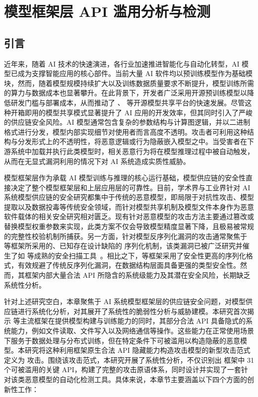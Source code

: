 \chapter{模型框架层 API 滥用分析与检测}
\section{引言}
近年来，随着 AI 技术的快速演进，各行业加速推进智能化与自动化转型，AI 模型已成为支撑智能应用的核心部件。当前大量 AI 软件均以预训练模型作为基础模块，然而，随着模型规模持续扩大以及训练数据质量要求不断提升，模型训练所需的算力与数据成本也显著攀升。在此背景下，开发者广泛采用开源预训练模型以降低研发门槛与部署成本，从而推动了 、 等开源模型共享平台的快速发展。尽管这种开箱即用的模型共享模式显著提升了 AI 应用的开发效率，但其同时引入了严峻的供应链安全风险。AI 模型通常包含复杂的参数结构与计算图逻辑，并以二进制格式进行分发，模型内部实现细节对使用者而言高度不透明。攻击者可利用这种结构与分发形式上的不透明性，将恶意逻辑或行为隐蔽嵌入模型之中。当受害者在下游系统中加载并执行此类模型时，相关恶意行为将在模型推理过程中被自动触发，从而在无显式漏洞利用的情况下对 AI 系统造成实质性威胁。

模型框架层作为承载 AI 模型训练与推理的核心运行基础，模型供应链的安全性直接决定了整个模型框架层和上层应用层的可靠性。目前，学术界与工业界针对 AI 系统模型供应链的安全研究都集中于传统的恶意模型，即局限于对抗性攻击、模型提取以及数据投毒等传统安全领域，而针对模型共享机制及模型文件本身作为恶意软件载体的相关安全研究相对匮乏。现有针对恶意模型的攻击方法主要通过篡改或替换模型权重参数来实现，此类方案不仅会导致模型精度显著下降，且极易被常规的完整性校验机制所捕获。另一方面，针对模型反序列化漏洞的攻击通常聚焦于  等框架所采用的、已知存在设计缺陷的  序列化机制，该类漏洞已被广泛研究并催生了如  等成熟的安全扫描工具~\cite{fickling_defcon_2021}。相比之下，等框架采用了安全性更高的序列化格式，有效规避了传统反序列化漏洞，在数据结构层面具备更强的类型安全性。然而，其框架内部大量合法 API 所隐含的系统级能力及其潜在安全风险，长期缺乏系统性分析。

针对上述研究空白，本章聚焦于 AI 系统模型框架层的供应链安全问题，对模型供应链进行系统化分析，对其展开了系统性的脆弱性分析与威胁建模。本研究首次揭示 等主流框架在提供模型构建与训练能力的同时，其部分合法 API 具备隐式的系统能力，例如文件读取、文件写入以及网络通信等操作。这些能力在正常使用场景下服务于数据处理与分布式训练，但在特定条件下可被滥用以构造隐蔽的恶意模型。本研究将这种利用框架原生合法 API 隐藏能力构造攻击模型的新型攻击范式定义为  攻击。围绕该攻击范式，本研究开展了系统性分析，不仅识别出  框架中 31 个可被滥用的关键 API，构建了完整的攻击原语体系，同时设计并实现了一套针对该类恶意模型的自动化检测工具。具体来说，本章节主要涵盖以下四个方面的创新性工作：

